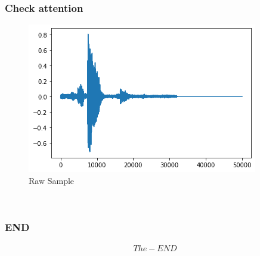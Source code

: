 \documentclass{beamer}
\begin{document}
\begin{frame}
\frametitle{Check attention}
\begin{figure}[h]
    \includegraphics[width=\columnwidth]{raw.png}
    \caption{Raw Sample}
\end{figure}\\
\end{frame}

\begin{frame}
\frametitle{END}
\begin{align*}
    The-END 
\end{align*}
    
\end{frame}

\end{document}
